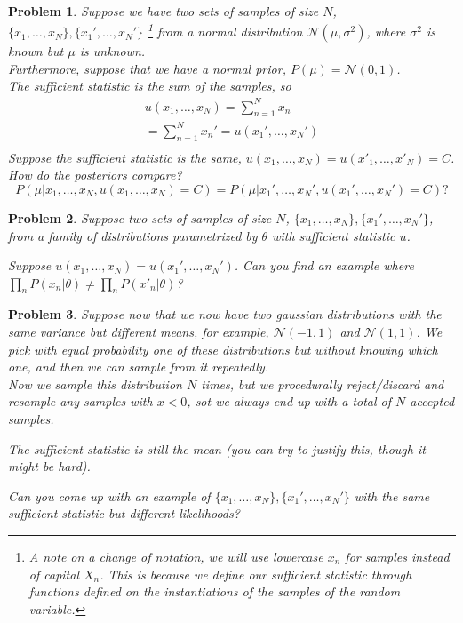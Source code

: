 \documentclass[a4paper]{article}
\newtheorem{problem}{Problem}[section]
\begin{document}
\begin{problem}
  Suppose we have two sets of samples of size $N$, $\{x_1,\ldots,x_N\},\{x_1',\ldots,x_N'\}$ \footnote{A note on a change of notation, we will use lowercase $x_n$ for samples instead of capital $X_n$.  This is because we define our sufficient statistic through functions defined on the instantiations of the samples of the random variable.} from a normal distribution $\mathcal{N}( \mu, \sigma^2 )$, where $\sigma^2$ is known but $\mu$ is unknown.  \\
  Furthermore, suppose that we have a normal prior, $P(\mu) = \mathcal{N}(0,1)$.  \\
  The sufficient statistic is the sum of the samples, so 
\begin{equation}
  \begin{split}
    u(x_1,\ldots,x_N) = \sum_{n=1}^N x_n \\
    = \sum_{n=1}^N x_n' = u(x_1',\ldots,x_N') \\
  \end{split}
  \label{}
\end{equation}
Suppose the sufficient statistic is the same, $u(x_1,\ldots,x_N) = u(x'_1,\ldots,x'_N) = C$.  How do the posteriors compare?
\begin{equation}
  P( \mu \vert x_1,\ldots,x_N, u(x_1,\ldots,x_N) = C ) = P( \mu \vert x_1',\ldots,x_N', u(x_1',\ldots,x_N') = C ) ?
  \label{}
\end{equation}

\end{problem}

\begin{problem}
Suppose two sets of samples of size $N$, $\{x_1,\ldots,x_N\},\{x_1',\ldots,x_N'\}$, from a family of distributions parametrized by $\theta$ with sufficient statistic $u$.

Suppose $u(x_1,\ldots,x_N) = u(x_1',\ldots,x_N')$.  Can you find an example where $ \prod_n P(x_n \vert \theta) \neq \prod_n P(x'_n \vert \theta) $?
\end{problem}

\begin{problem}
  Suppose now that we now have two gaussian distributions with the same variance but different means, for example, $\mathcal{N}(-1,1)$ and $\mathcal{N}(1,1)$.  We pick with equal probability one of these distributions but without knowing which one, and then we can sample from it repeatedly. \\
Now we sample this distribution $N$ times, but we procedurally reject/discard and resample any samples with $x<0$,  sot we always end up with a total of $N$ accepted samples.

The sufficient statistic is still the mean (you can try to justify this, though it might be hard).

Can you come up with an example of $\{x_1,\ldots,x_N\}, \{x_1',\ldots,x_N'\}$ with the same sufficient statistic but different likelihoods?
\end{problem}
\end{document}

